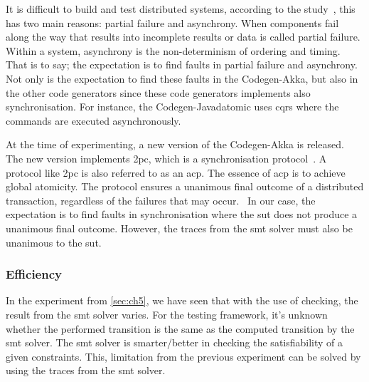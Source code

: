 It is difficult to build and test distributed systems, according to the
study~\cite[p.~1]{mccaffrey2016verification}, this has two main reasons: partial
failure and asynchrony. When components fail along the way that results into
incomplete results or data is called partial failure. Within a system,
asynchrony is the non-determinism of ordering and timing. That is to say; the
expectation is to find faults in partial failure and asynchrony. Not only is the
expectation to find these faults in the Codegen-Akka, but also in the other code
generators since these code generators implements also synchronisation. For
instance, the Codegen-Javadatomic uses \gls{cqrs} where the commands are
executed asynchronously.

At the time of experimenting, a new version of the Codegen-Akka is
released. The new version implements \gls{2pc}, which is a synchronisation
protocol~\cite[p.~3204]{al2009two}. A protocol like \gls{2pc} is also referred
to as an \gls{acp}. The essence of \gls{acp} is to achieve global atomicity. The
protocol ensures a unanimous final outcome of a distributed transaction,
regardless of the failures that may occur.~\cite[p.~3204]{al2009two} In our
case, the expectation is to find faults in synchronisation where the \gls{sut}
does not produce a unanimous final outcome. However, the traces from the
\gls{smt} solver must also be unanimous to the \gls{sut}.


\subsubsection{Efficiency}
In the experiment from \autoref{sec:ch5}, we have seen that with the use of
checking, the result from the \gls{smt} solver varies. For the testing
framework, it's unknown whether the performed transition is the same as the
computed transition by the \gls{smt} solver. The \gls{smt} solver is
smarter/better in checking the satisfiability of a given constraints. This,
limitation from the previous experiment can be solved by using the traces from
the \gls{smt} solver.


